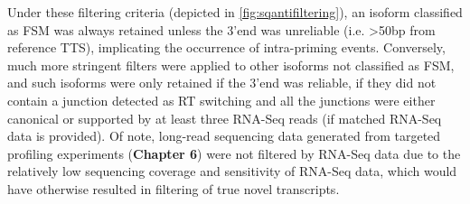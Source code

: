 Under these filtering criteria (depicted in \cref{fig:sqantifiltering}), an isoform classified as FSM was always retained unless the 3'end was unreliable (i.e. >50bp from reference TTS), implicating the occurrence of intra-priming events. Conversely, much more stringent filters were applied to other isoforms not classified as FSM, and such isoforms were only retained if the 3'end was reliable, if they did not contain a junction detected as RT switching and all the junctions were either canonical or supported by at least three RNA-Seq reads (if matched RNA-Seq data is provided). Of note, long-read sequencing data generated from targeted profiling experiments (\textbf{Chapter 6}) were not filtered by RNA-Seq data due to the relatively low sequencing coverage and sensitivity of RNA-Seq data, which would have otherwise resulted in filtering of true novel transcripts. 

